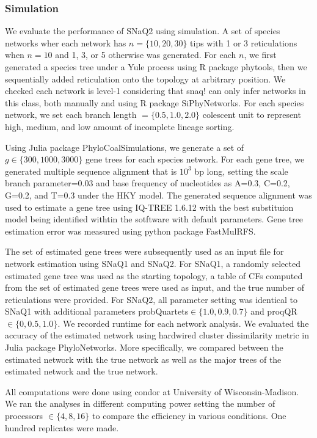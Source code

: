 \documentclass[unnumsec,webpdf,contemporary,large]{oup-authoring-template}%
\theoremstyle{thmstyleone}%
\theoremstyle{thmstyletwo}%
\theoremstyle{thmstylethree}%
\begin{document}
\subsubsection{Simulation}
We evaluate the performance of SNaQ2 using simulation. A set of species networks wher each network has $n=\{10, 20, 30\}$ tips with 1 or 3 reticulations when $n=10$ and 1, 3, or 5 otherwise was generated. For each $n$, we first generated a species tree under a Yule process using R package phytools, then we sequentially added reticulation onto the topology at arbitrary position. We checked each network is level-1 considering that snaq! can only infer networks in this class, both manually and using R package SiPhyNetworks. For each species network, we set each branch length $=\{0.5,1.0,2.0\}$ colescent unit to represent high, medium, and low amount of incomplete lineage sorting.

Using Julia package PhyloCoalSimulations, we generate a set of $g\in\{300, 1000, 3000\}$ gene trees for each species network. For each gene tree, we generated multiple sequence alignment that is $10^3$ bp long, setting the scale branch parameter=0.03 and base frequency of nucleotides as A=0.3, C=0.2, G=0.2, and T=0.3 under the HKY model. The generated sequence alignment was used to estimate a gene tree using IQ-TREE 1.6.12 with the best substituion model being identified withtin the sotftware with default parameters. Gene tree estimation error was measured using python package FastMulRFS.

The set of estimated gene trees were subsequently used as an input file for network estimation using SNaQ1 and SNaQ2. For SNaQ1, a randomly selected estimated gene tree was used as the starting topology, a table of CFs computed from the set of estimated gene trees were used as input, and the true number of reticulations were provided. For SNaQ2, all parameter setting was identical to SNaQ1 with additional parameters probQuartets$\in\{1.0, 0.9, 0.7\}$ and proqQR$\in\{0,0.5,1.0\}$. We recorded runtime for each network analysis. We evaluated the accuracy of the estimated network using hardwired cluster dissimilarity metric in Julia package PhyloNetworks. More specifically, we compared between the estimated network with the true network as well as the major trees of the estimated network and the true network. 

All computations were done using condor at University of Wisconsin-Madison. We ran the analyses in different computing power setting the number of processors $\in\{4,8,16\}$ to compare the efficiency in various conditions. One hundred replicates were made.
\end{document}
